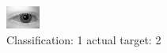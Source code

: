 \begin{figure}[h!]
\begin{center}
\includegraphics[width=0.60\columnwidth]{figures/ID371_class_1_target_2.png}
\end{center}
\caption{ Classification: 1 actual target: 2}
\label{fig:ID371_class_1_target_2}
\end{figure}
